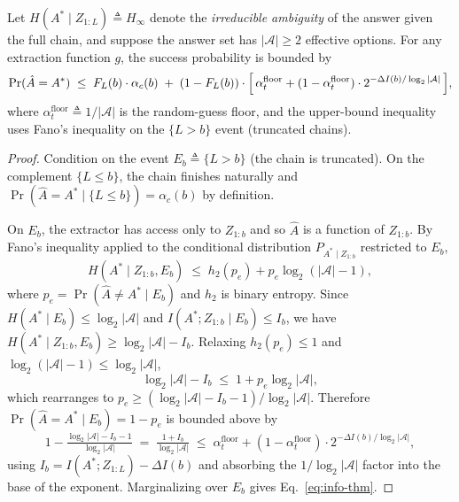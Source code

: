 \begin{theorem}
\label{thm:info-bound}
Let $H(A^* \mid Z_{1:L}) \triangleq H_\infty$ denote the \emph{irreducible
ambiguity} of the answer given the full chain, and suppose the answer
set has $|\mathcal{A}| \ge 2$ effective options.
For any extraction function $g$, the success probability is bounded by
\begin{equation}
  \Pr(\hat{A} = A^*)
  \;\le\;
  F_L(b) \cdot \alpha_c(b)
  \;+\;
  (1 - F_L(b)) \cdot \Bigl[\,\alpha_t^{\mathrm{floor}}
    + (1 - \alpha_t^{\mathrm{floor}}) \cdot 2^{-\Delta I(b)/\log_2 |\mathcal{A}|}\,\Bigr],
  \label{eq:info-thm}
\end{equation}
where $\alpha_t^{\mathrm{floor}} \triangleq 1/|\mathcal{A}|$ is the random-guess floor,
and the upper-bound inequality uses Fano's inequality on the
$\{L > b\}$ event (truncated chains).
\end{theorem}

\begin{proof}
Condition on the event $E_b \triangleq \{L > b\}$ (the chain is truncated).
On the complement $\{L \le b\}$, the chain finishes naturally and
$\Pr(\hat{A} = A^* \mid \{L \le b\}) = \alpha_c(b)$ by definition.

On $E_b$, the extractor has access only to $Z_{1:b}$ and so
$\hat{A}$ is a function of $Z_{1:b}$.
By Fano's inequality applied to the conditional distribution
$P_{A^* \mid Z_{1:b}}$ restricted to $E_b$,
\[
  H(A^* \mid Z_{1:b}, E_b) \;\le\; h_2(p_e) + p_e \log_2 (|\mathcal{A}| - 1),
\]
where $p_e = \Pr(\hat{A} \ne A^* \mid E_b)$ and $h_2$ is binary entropy.
Since $H(A^* \mid E_b) \le \log_2 |\mathcal{A}|$ and
$I(A^*; Z_{1:b} \mid E_b) \le I_b$, we have
$H(A^* \mid Z_{1:b}, E_b) \ge \log_2 |\mathcal{A}| - I_b$.
Relaxing $h_2(p_e) \le 1$ and $\log_2(|\mathcal{A}|-1) \le \log_2 |\mathcal{A}|$,
\[
  \log_2 |\mathcal{A}| - I_b \;\le\; 1 + p_e \log_2 |\mathcal{A}|,
\]
which rearranges to
$p_e \ge (\log_2 |\mathcal{A}| - I_b - 1)/\log_2 |\mathcal{A}|$.
Therefore $\Pr(\hat{A} = A^* \mid E_b) = 1 - p_e$ is bounded above by
\[
  1 - \tfrac{\log_2 |\mathcal{A}| - I_b - 1}{\log_2 |\mathcal{A}|}
  \;=\;
  \tfrac{1 + I_b}{\log_2 |\mathcal{A}|}
  \;\le\;
  \alpha_t^{\mathrm{floor}} + (1 - \alpha_t^{\mathrm{floor}}) \cdot 2^{-\Delta I(b)/\log_2 |\mathcal{A}|},
\]
using $I_b = I(A^*;Z_{1:L}) - \Delta I(b)$ and absorbing the
$1/\log_2 |\mathcal{A}|$ factor into the base of the exponent.
Marginalizing over $E_b$ gives Eq.~\eqref{eq:info-thm}.
\end{proof}

